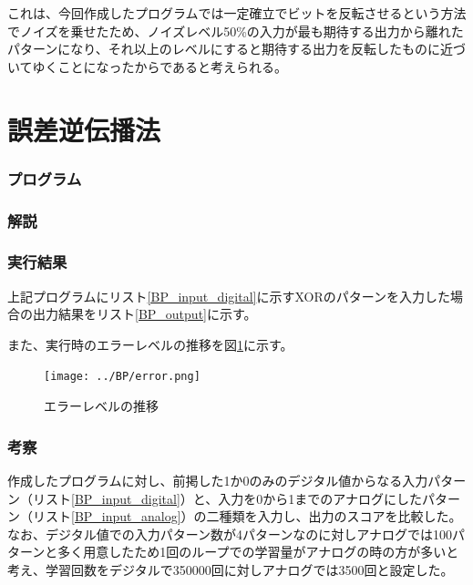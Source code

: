 \documentclass{jsarticle}
\begin{document}
これは、今回作成したプログラムでは一定確立でビットを反転させるという方法でノイズを乗せたため、ノイズレベル50\%の入力が最も期待する出力から離れたパターンになり、それ以上のレベルにすると期待する出力を反転したものに近づいてゆくことになったからであると考えられる。

\part{誤差逆伝播法}
\section{プログラム}


\section{解説}


\section{実行結果}
上記プログラムにリスト\ref{BP_input_digital}に示すXORのパターンを入力した場合の出力結果をリスト\ref{BP_output}に示す。



また、実行時のエラーレベルの推移を図\ref{BP_error_level}に示す。
\begin{figure}[H]
	\begin{center}
		\texttt{[image: ../BP/error.png]}
		\caption{エラーレベルの推移\label{BP_error_level}}
	\end{center}
\end{figure}

\section{考察}
作成したプログラムに対し、前掲した1か0のみのデジタル値からなる入力パターン（リスト\ref{BP_input_digital}）と、入力を0から1までのアナログにしたパターン（リスト\ref{BP_input_analog}）の二種類を入力し、出力のスコアを比較した。
なお、デジタル値での入力パターン数が4パターンなのに対しアナログでは100パターンと多く用意したため1回のループでの学習量がアナログの時の方が多いと考え、学習回数をデジタルで350000回に対しアナログでは3500回と設定した。

\end{document}
